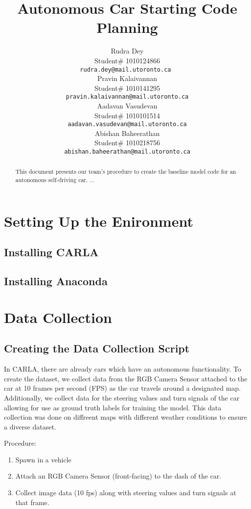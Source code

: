 \documentclass{article} %
\title{Autonomous Car Starting Code Planning\\}
\author{Rudra Dey  \\
Student\# 1010124866\\
\texttt{rudra.dey@mail.utoronto.ca } \\
\And
Pravin Kalaivannan  \\
Student\# 1010141295 \\
\texttt{pravin.kalaivannan@mail.utoronto.ca} \\
\AND
Aadavan Vasudevan  \\
Student\# 1010101514 \\
\texttt{aadavan.vasudevan@mail.utoronto.ca} \\
\And
Abishan Baheerathan \\
Student\# 1010218756 \\
\texttt{abishan.baheerathan@mail.utoronto.ca} \\
\AND
}
\begin{document}
\maketitle

\begin{abstract}
This document presents our team's procedure to create the baseline model
code for an autonomous self-driving car. ...\\

\end{abstract}

\section{Setting Up the Enironment}

\subsection{Installing CARLA}

\subsection{Installing Anaconda}


\section{Data Collection}

\subsection{Creating the Data Collection Script}

In CARLA, there are already cars which have an autonomous functionality.
To create the dataset, we collect data from the RGB Camera Sensor attached to the car at 10 frames per second (FPS) as the car
travels around a designated map. Additionally, we collect data for the steering values and turn signals of the car
allowing for use as ground truth labels for training the model. This data collection was done on diffreent maps with different weather conditions
to ensure a diverse dataset.

Procedure:
\begin{enumerate}
  \item{Spawn in a vehicle}
  \item{Attach an RGB Camera Sensor (front-facing) to the dash of the car.}
  \item{Collect image data (10 fps) along with steering values and turn signals at that frame.}
\end{enumerate}
\end{document}
